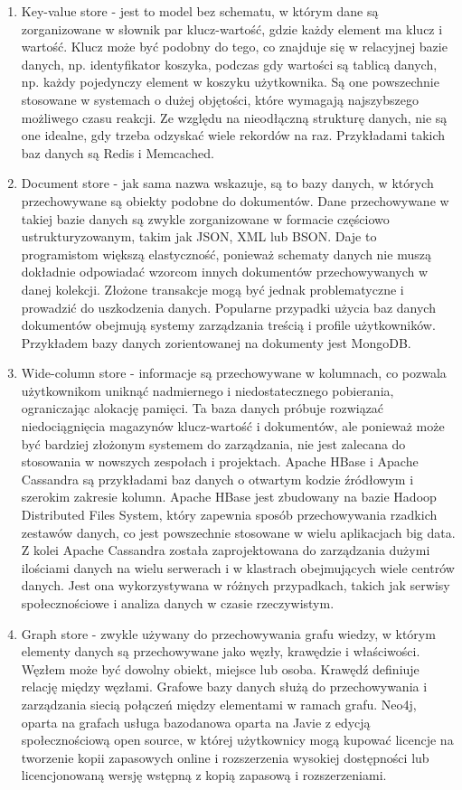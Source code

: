 \documentclass[12pt, a4paper, twoside, openany]{book}
\begin{document}
\begin{enumerate}[label=--]
    \item Key-value store - jest to model bez schematu, w którym dane są zorganizowane w słownik par klucz-wartość, gdzie każdy element ma klucz i wartość. Klucz może być podobny do tego, co znajduje się w relacyjnej bazie danych, np. identyfikator koszyka, podczas gdy wartości są tablicą danych, np. każdy pojedynczy element w koszyku użytkownika. Są one powszechnie stosowane w systemach o dużej objętości, które wymagają najszybszego możliwego czasu reakcji. Ze względu na nieodłączną strukturę danych, nie są one idealne, gdy trzeba odzyskać wiele rekordów na raz. Przykładami takich baz danych są Redis i Memcached.
    \item Document store - jak sama nazwa wskazuje, są to bazy danych, w których przechowywane są obiekty podobne do dokumentów. Dane przechowywane w takiej bazie danych są zwykle zorganizowane w formacie częściowo ustrukturyzowanym, takim jak JSON, XML lub BSON. Daje to programistom większą elastyczność, ponieważ schematy danych nie muszą dokładnie odpowiadać wzorcom innych dokumentów przechowywanych w danej kolekcji. Złożone transakcje mogą być jednak problematyczne i prowadzić do uszkodzenia danych. Popularne przypadki użycia baz danych dokumentów obejmują systemy zarządzania treścią i profile użytkowników. Przykładem bazy danych zorientowanej na dokumenty jest MongoDB.
    \item Wide-column store - informacje są przechowywane w kolumnach, co pozwala użytkownikom uniknąć nadmiernego i niedostatecznego pobierania, ograniczając alokację pamięci. Ta baza danych próbuje rozwiązać niedociągnięcia magazynów klucz-wartość i dokumentów, ale ponieważ może być bardziej złożonym systemem do zarządzania, nie jest zalecana do stosowania w nowszych zespołach i projektach. Apache HBase i Apache Cassandra są przykładami baz danych o otwartym kodzie źródłowym i szerokim zakresie kolumn. Apache HBase jest zbudowany na bazie Hadoop Distributed Files System, który zapewnia sposób przechowywania rzadkich zestawów danych, co jest powszechnie stosowane w wielu aplikacjach big data. Z kolei Apache Cassandra została zaprojektowana do zarządzania dużymi ilościami danych na wielu serwerach i w klastrach obejmujących wiele centrów danych. Jest ona wykorzystywana w różnych przypadkach, takich jak serwisy społecznościowe i analiza danych w czasie rzeczywistym.
    \item Graph store - zwykle używany do przechowywania grafu wiedzy, w którym elementy danych są przechowywane jako węzły, krawędzie i właściwości. Węzłem może być dowolny obiekt, miejsce lub osoba. Krawędź definiuje relację między węzłami. Grafowe bazy danych służą do przechowywania i zarządzania siecią połączeń między elementami w ramach grafu. Neo4j, oparta na grafach usługa bazodanowa oparta na Javie z edycją społecznościową open source, w której użytkownicy mogą kupować licencje na tworzenie kopii zapasowych online i rozszerzenia wysokiej dostępności lub licencjonowaną wersję wstępną z kopią zapasową i rozszerzeniami.
\end{enumerate}
\end{document}
